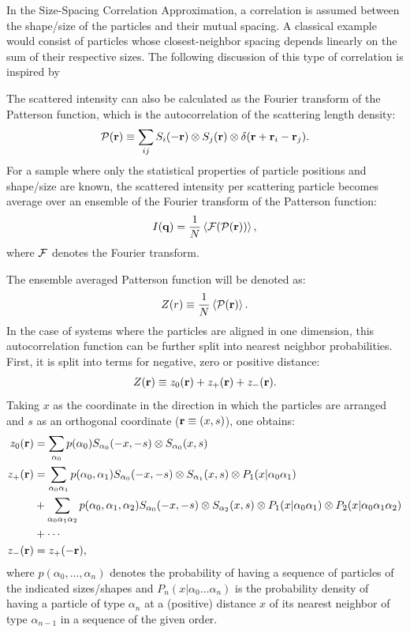 In the Size-Spacing Correlation Approximation, a correlation is assumed between the shape/size of the particles and their mutual spacing. A classical example would consist of particles whose closest-neighbor spacing depends linearly on the sum of their respective sizes. The following discussion of this type of correlation is inspired by \cite{LaLR07}

The scattered intensity can also be calculated as the Fourier transform of the Patterson function, which is the autocorrelation of the scattering length density:
\begin{equation*}
  \mathcal{P} (\mathbf{r} ) \equiv \sum_{ij} S_i(-\mathbf{r} )\otimes S_j(\mathbf{r} )\otimes \delta (\mathbf{r} + \mathbf{r}_i - \mathbf{r}_j ).
\end{equation*}
For a sample where only the statistical properties of particle positions and shape/size are known, the scattered intensity per scattering particle becomes average over an ensemble of the Fourier transform of the Patterson function:
\begin{equation*}
  I(\mathbf{q} ) = \frac{1}{N}\left\langle\mathcal{F} (\mathcal{P} (\mathbf{r} ))\right\rangle,
\end{equation*}
where $\mathcal{F}$ denotes the Fourier transform.

The ensemble averaged Patterson function will be denoted as:
\begin{equation*}
  Z(r) \equiv \frac{1}{N}\left\langle\mathcal{P} (\mathbf{r} )\right\rangle.
\end{equation*}
In the case of systems where the particles are aligned in one dimension, this autocorrelation function can be further split into nearest neighbor probabilities. First, it is split into terms for negative, zero or positive distance:
\begin{equation*}
  Z(\mathbf{r} ) \equiv z_0(\mathbf{r} ) + z_+(\mathbf{r} ) + z_-(\mathbf{r} ).
\end{equation*}
Taking $x$ as the coordinate in the direction in which the particles are arranged and $s$ as an orthogonal coordinate ($\mathbf{r} \equiv (x,s)$), one obtains:
\begin{align*}
  z_0(\mathbf{r} ) &= \sum_{\alpha_0} p(\alpha_0) S_{\alpha_0}(-x,-s) \otimes S_{\alpha_0}(x,s)  \\
  z_+(\mathbf{r} ) &= \sum_{\alpha_0\alpha_1} p(\alpha_0,\alpha_1) S_{\alpha_0}(-x,-s) \otimes S_{\alpha_1}(x,s) \otimes P_1(x|\alpha_0\alpha_1)  \\
               &+ \sum_{\alpha_0\alpha_1\alpha_2} p(\alpha_0,\alpha_1,\alpha_2) S_{\alpha_0}(-x,-s) \otimes S_{\alpha_2}(x,s) \otimes P_1(x|\alpha_0\alpha_1) \otimes P_2(x|\alpha_0\alpha_1\alpha_2)  \\
               &+ \dotsb \\
  z_-(\mathbf{r} ) &= z_+(-\mathbf{r} ),
\end{align*}
where $p(\alpha_0,\dotsc ,\alpha_n)$ denotes the probability of having a sequence of particles of the indicated sizes/shapes and $P_n(x|\alpha_0\dotsc\alpha_n)$ is the probability density of having a particle of type $\alpha_n$ at a (positive) distance $x$ of its nearest neighbor of type $\alpha_{n-1}$ in a sequence of the given order.

